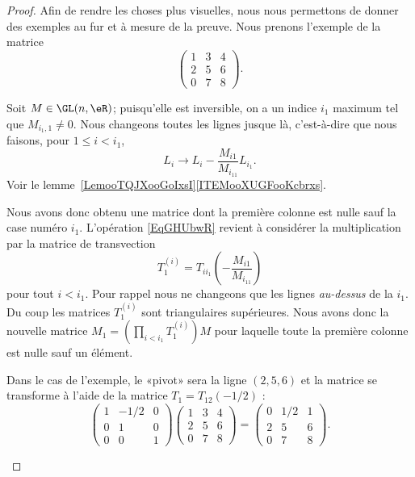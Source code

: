 \begin{proof}
	Afin de rendre les choses plus visuelles, nous nous permettons de donner des exemples au fur et à mesure de la preuve. Nous prenons l'exemple de la matrice
	\begin{equation}
		\begin{pmatrix}
			1 & 3 & 4 \\
			2 & 5 & 6 \\
			0 & 7 & 8
		\end{pmatrix}.
	\end{equation}
	\begin{subproof}
		\spitem[Existence]
		Soit \( M\in \GL(n,\eR)\); puisqu'elle est inversible, on a un indice \( i_1\) maximum tel que \( M_{i_1,1}\neq 0\). Nous changeons toutes les lignes jusque là, c'est-à-dire que nous faisons, pour \( 1\leq i< i_1\),
		\begin{equation}        \label{EqGHUbwR}
			L_i\to L_i-\frac{ M_{i1} }{ M_{i_11} }L_{i_1}.
		\end{equation}
		Voir le lemme~\ref{LemooTQJXooGoIxsI}\ref{ITEMooXUGFooKcbrxs}.

		Nous avons donc obtenu une matrice dont la première colonne est nulle sauf la case numéro \( i_1\). L'opération \eqref{EqGHUbwR} revient à considérer la multiplication par la matrice de transvection
		\begin{equation}
			T_1^{(i)}=T_{ii_1}\left( -\frac{ M_{i1} }{ M_{i_11} } \right)
		\end{equation}
		pour tout \( i<i_1\). Pour rappel nous ne changeons que les lignes \emph{au-dessus} de la \( i_1\). Du coup les matrices \( T^{(i)}_1\) sont triangulaires supérieures. Nous avons donc la nouvelle matrice \( M_1=\left( \prod_{i<i_1}T_1^{(i)} \right)M\) pour laquelle toute la première colonne est nulle sauf un élément.

		Dans le cas de l'exemple, le «pivot» sera la ligne \( (2,5,6)\) et la matrice se transforme à l'aide de la matrice \( T_1=T_{12}(-1/2)\) :
		\begin{equation}    \label{EqyjXIYf}
			\begin{pmatrix}
				1 & -1/2 & 0 \\
				0 & 1    & 0 \\
				0 & 0    & 1
			\end{pmatrix}
			\begin{pmatrix}
				1 & 3 & 4 \\
				2 & 5 & 6 \\
				0 & 7 & 8
			\end{pmatrix}=
			\begin{pmatrix}
				0 & 1/2 & 1 \\
				2 & 5   & 6 \\
				0 & 7   & 8
			\end{pmatrix}.
		\end{equation}


\end{subproof}
\end{proof}
